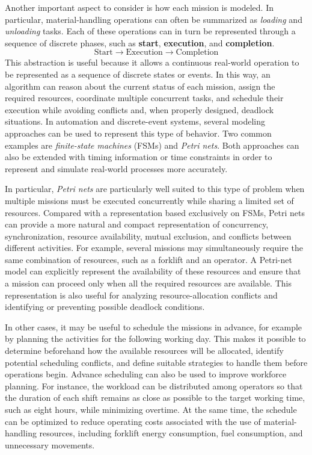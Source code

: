 Another important aspect to consider is how each mission is modeled. In particular, material-handling operations can often be summarized as \textit{loading} and \textit{unloading} tasks. Each of these operations can in turn be represented through a sequence of discrete phases, such as \textbf{start}, \textbf{execution}, and \textbf{completion}.
\[
\text{Start} \rightarrow \text{Execution} \rightarrow \text{Completion}
\]
This abstraction is useful because it allows a continuous real-world operation to be represented as a sequence of discrete states or events. In this way, an algorithm can reason about the current status of each mission, assign the required resources, coordinate multiple concurrent tasks, and schedule their execution while avoiding conflicts and, when properly designed, deadlock situations.
In automation and discrete-event systems, several modeling approaches can be used to represent this type of behavior. Two common examples are \textit{finite-state machines} (FSMs) and \textit{Petri nets}. Both approaches can also be extended with timing information or time constraints in order to represent and simulate real-world processes more accurately.

In particular, \textit{Petri nets} are particularly well suited to this type of problem when multiple missions must be executed concurrently while sharing a limited set of resources. Compared with a representation based exclusively on FSMs, Petri nets can provide a more natural and compact representation of concurrency, synchronization, resource availability, mutual exclusion, and conflicts between different activities. For example, several missions may simultaneously require the same combination of resources, such as a forklift and an operator. A Petri-net model can explicitly represent the availability of these resources and ensure that a mission can proceed only when all the required resources are available. This representation is also useful for analyzing resource-allocation conflicts and identifying or preventing possible deadlock conditions.

In other cases, it may be useful to schedule the missions in advance, for example by planning the activities for the following working day. This makes it possible to determine beforehand how the available resources will be allocated, identify potential scheduling conflicts, and define suitable strategies to handle them before operations begin. Advance scheduling can also be used to improve workforce planning. For instance, the workload can be distributed among operators so that the duration of each shift remains as close as possible to the target working time, such as eight hours, while minimizing overtime. At the same time, the schedule can be optimized to reduce operating costs associated with the use of material-handling resources, including forklift energy consumption, fuel consumption, and unnecessary movements.

